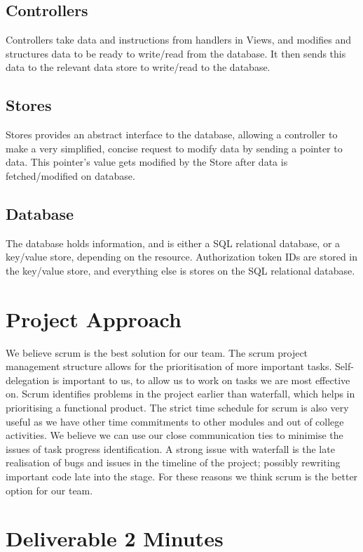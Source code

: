 \documentclass[a4paper,11pt]{report}
\begin{document}
\section{Controllers}
Controllers take data and instructions from handlers in Views, and modifies and
structures data to be ready to write/read from the database. It then sends this
data to the relevant data store to write/read to the database.

\section{Stores}
Stores provides an abstract interface to the database, allowing a controller to
make a very simplified, concise request to modify data by sending a pointer to
data. This pointer's value gets modified by the Store after data is
fetched/modified on database.

\section{Database}
The database holds information, and is either a SQL relational database, or a
key/value store, depending on the resource. Authorization token IDs are stored
in the key/value store, and everything else is stores on the SQL relational
database.

\chapter{Project Approach}
We believe scrum is the best solution for our team. The scrum project management
structure allows for the prioritisation of more important tasks. Self-delegation
is important to us, to allow us to work on tasks we are most effective on. Scrum
identifies problems in the project earlier than waterfall, which helps in
prioritising a functional product. The strict time schedule for scrum is also
very useful as we have other time commitments to other modules and out of
college activities. We believe we can use our close communication ties to
minimise the issues of task progress identification. A strong issue with
waterfall is the late realisation of bugs and issues in the timeline of the
project; possibly rewriting important code late into the stage. For these
reasons we think scrum is the better option for our team.

\chapter{Deliverable 2 Minutes}
\end{document}
